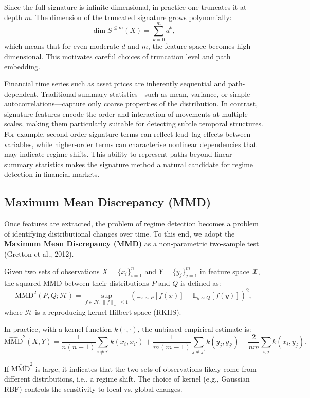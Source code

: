 Since the full signature is infinite-dimensional, in practice one truncates it at depth $m$. 
The dimension of the truncated signature grows polynomially:
\[
\dim S^{\leq m}(X) = \sum_{k=0}^m d^k,
\]
which means that for even moderate $d$ and $m$, the feature space becomes high-dimensional. This motivates careful choices of truncation level and path embedding.


Financial time series such as asset prices are inherently sequential and path-dependent. Traditional summary statistics---such as mean, variance, or simple autocorrelations---capture only coarse properties of the distribution. In contrast, signature features encode the order and interaction of movements at multiple scales, making them particularly suitable for detecting subtle temporal structures.  
For example, second-order signature terms can reflect lead--lag effects between variables, while higher-order terms can characterise nonlinear dependencies that may indicate regime shifts.  
This ability to represent paths beyond linear summary statistics makes the signature method a natural candidate for regime detection in financial markets.

\subsection{Maximum Mean Discrepancy (MMD)}

Once features are extracted, the problem of regime detection becomes a problem of identifying distributional changes over time. To this end, we adopt the \textbf{Maximum Mean Discrepancy (MMD)} as a non-parametric two-sample test (Gretton et al., 2012).  

Given two sets of observations $X = \{x_i\}_{i=1}^n$ and $Y = \{y_j\}_{j=1}^m$ in feature space $\mathcal{X}$, the squared MMD between their distributions $P$ and $Q$ is defined as:
\[
\mathrm{MMD}^2(P,Q;\mathcal{H}) = \sup_{f \in \mathcal{H}, \|f\|_{\mathcal{H}} \leq 1} \left( \mathbb{E}_{x \sim P}[f(x)] - \mathbb{E}_{y \sim Q}[f(y)] \right)^2,
\]
where $\mathcal{H}$ is a reproducing kernel Hilbert space (RKHS).  

In practice, with a kernel function $k(\cdot, \cdot)$, the unbiased empirical estimate is:
\[
\widehat{\mathrm{MMD}}^2(X,Y) = \frac{1}{n(n-1)} \sum_{i \neq i'} k(x_i, x_{i'}) + \frac{1}{m(m-1)} \sum_{j \neq j'} k(y_j, y_{j'}) - \frac{2}{nm} \sum_{i,j} k(x_i, y_j).
\]

If $\widehat{\mathrm{MMD}}^2$ is large, it indicates that the two sets of observations likely come from different distributions, i.e., a regime shift. The choice of kernel (e.g., Gaussian RBF) controls the sensitivity to local vs. global changes.



